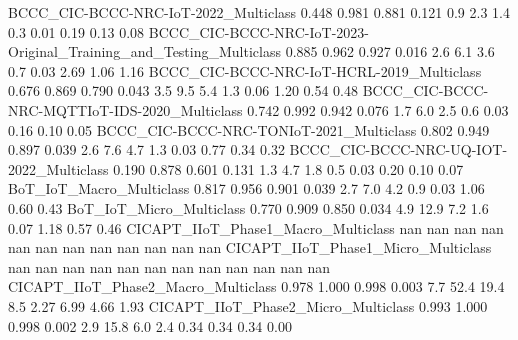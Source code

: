 BCCC_CIC-BCCC-NRC-IoT-2022_Multiclass                                    0.448      0.981       0.881      0.121          0.9          2.3           1.4          0.3         0.01         0.19          0.13         0.08
BCCC_CIC-BCCC-NRC-IoT-2023-Original_Training_and_Testing_Multiclass      0.885      0.962       0.927      0.016          2.6          6.1           3.6          0.7         0.03         2.69          1.06         1.16
BCCC_CIC-BCCC-NRC-IoT-HCRL-2019_Multiclass                               0.676      0.869       0.790      0.043          3.5          9.5           5.4          1.3         0.06         1.20          0.54         0.48
BCCC_CIC-BCCC-NRC-MQTTIoT-IDS-2020_Multiclass                            0.742      0.992       0.942      0.076          1.7          6.0           2.5          0.6         0.03         0.16          0.10         0.05
BCCC_CIC-BCCC-NRC-TONIoT-2021_Multiclass                                 0.802      0.949       0.897      0.039          2.6          7.6           4.7          1.3         0.03         0.77          0.34         0.32
BCCC_CIC-BCCC-NRC-UQ-IOT-2022_Multiclass                                 0.190      0.878       0.601      0.131          1.3          4.7           1.8          0.5         0.03         0.20          0.10         0.07
BoT_IoT_Macro_Multiclass                                                 0.817      0.956       0.901      0.039          2.7          7.0           4.2          0.9         0.03         1.06          0.60         0.43
BoT_IoT_Micro_Multiclass                                                 0.770      0.909       0.850      0.034          4.9         12.9           7.2          1.6         0.07         1.18          0.57         0.46
CICAPT_IIoT_Phase1_Macro_Multiclass                                        nan        nan         nan        nan          nan          nan           nan          nan          nan          nan           nan          nan
CICAPT_IIoT_Phase1_Micro_Multiclass                                        nan        nan         nan        nan          nan          nan           nan          nan          nan          nan           nan          nan
CICAPT_IIoT_Phase2_Macro_Multiclass                                      0.978      1.000       0.998      0.003          7.7         52.4          19.4          8.5         2.27         6.99          4.66         1.93
CICAPT_IIoT_Phase2_Micro_Multiclass                                      0.993      1.000       0.998      0.002          2.9         15.8           6.0          2.4         0.34         0.34          0.34         0.00

